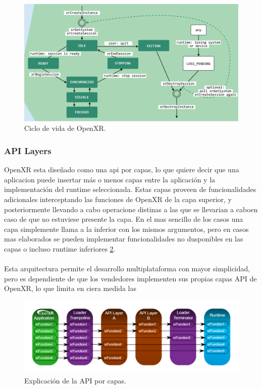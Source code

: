 \begin{figure}[hp!]
  \centering
  \includegraphics[width=1.0\textwidth]{imaxes/openXR_life_cycle.png}
  \caption{Ciclo de vida de OpenXR.}
  \label{fig:openxrlifecycle}
\end{figure}
\paragraph{}

\subsubsection{API Layers}
OpenXR esta diseñado como una \acrshort{api} por capas, lo que quiere decir que una aplicacion puede insertar más o menos capas entre la aplicación y la implementación del runtime seleccionada. Estas capas proveen de funcionalidades adicionales interceptando las funciones de OpenXR de la capa superior, y posteriormente llevando a cabo operacione distinas a las que se llevarian a caboen caso de que no estuviese presente la capa. En el mas sencillo de los casos una capa simplemente llama a la inferior con los mismos argumentos, pero en casos mas elaborados se pueden implementar funcionalidades no dusponibles en las capas o incluso runtime inferiores \ref{fig:openxrapilayer}.
\paragraph{}
Esta arquitectura permite el desarrollo multiplataforma con mayor simplicidad, pero es dependiente de que los vendedores implementen sus propias capas API de OpenXR, lo que limita en ciera medida las 


\begin{figure}[hp!]
  \centering
  \includegraphics[width=1.0\textwidth]{imaxes/openxr_api_layer_graph.png}
  \caption{Explicación de la API por capas.}
  \label{fig:openxrapilayer}
\end{figure}


